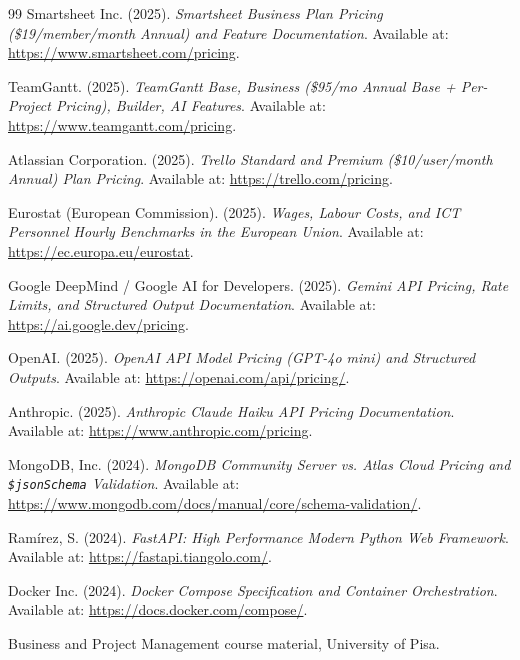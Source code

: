 \documentclass[11pt,a4paper]{report}
\begin{document}
\begin{thebibliography}{99}
Smartsheet Inc. (2025). \textit{Smartsheet Business Plan Pricing (\$19/member/month Annual) and Feature Documentation}. Available at: \url{https://www.smartsheet.com/pricing}.

TeamGantt. (2025). \textit{TeamGantt Base, Business (\$95/mo Annual Base + Per-Project Pricing), Builder, AI Features}. Available at: \url{https://www.teamgantt.com/pricing}.

Atlassian Corporation. (2025). \textit{Trello Standard and Premium (\$10/user/month Annual) Plan Pricing}. Available at: \url{https://trello.com/pricing}.

Eurostat (European Commission). (2025). \textit{Wages, Labour Costs, and ICT Personnel Hourly Benchmarks in the European Union}. Available at: \url{https://ec.europa.eu/eurostat}.

Google DeepMind / Google AI for Developers. (2025). \textit{Gemini API Pricing, Rate Limits, and Structured Output Documentation}. Available at: \url{https://ai.google.dev/pricing}.

OpenAI. (2025). \textit{OpenAI API Model Pricing (GPT-4o mini) and Structured Outputs}. Available at: \url{https://openai.com/api/pricing/}.

Anthropic. (2025). \textit{Anthropic Claude Haiku API Pricing Documentation}. Available at: \url{https://www.anthropic.com/pricing}.

MongoDB, Inc. (2024). \textit{MongoDB Community Server vs. Atlas Cloud Pricing and {\normalfont\texttt{\$jsonSchema}} Validation}. Available at: \url{https://www.mongodb.com/docs/manual/core/schema-validation/}.

Ramírez, S. (2024). \textit{FastAPI: High Performance Modern Python Web Framework}. Available at: \url{https://fastapi.tiangolo.com/}.

Docker Inc. (2024). \textit{Docker Compose Specification and Container Orchestration}. Available at: \url{https://docs.docker.com/compose/}.

Business and Project Management course material, University of Pisa.
\end{thebibliography}
\end{document}
